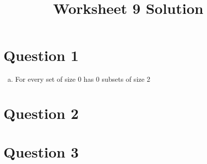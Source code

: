 \documentclass[12pt]{article}
\begin{document}
\title{Worksheet 9 Solution}
\maketitle

\section*{Question 1}
\begin{enumerate}[a.]
    \item

    For every set of size 0 has 0 subsets of size 2
\end{enumerate}

\section*{Question 2}

\section*{Question 3}
\end{document}
